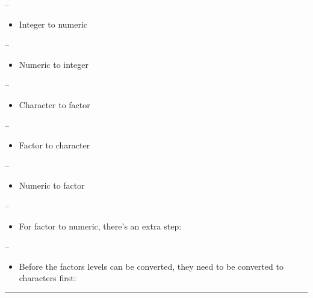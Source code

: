 \documentclass[]{article}
\newenvironment{Shaded}{\begin{snugshade}}{\end{snugshade}}
\newcommand{\KeywordTok}[1]{\textcolor[rgb]{0.13,0.29,0.53}{\textbf{#1}}}
\newcommand{\NormalTok}[1]{#1}
\newcommand{\OperatorTok}[1]{\textcolor[rgb]{0.81,0.36,0.00}{\textbf{#1}}}
\newcommand{\StringTok}[1]{\textcolor[rgb]{0.31,0.60,0.02}{#1}}
\providecommand{\tightlist}{%
  \setlength{\itemsep}{0pt}\setlength{\parskip}{0pt}}
\begin{document}
--

\begin{itemize}
\tightlist
\item
  Integer to numeric
\end{itemize}

--

\begin{itemize}
\tightlist
\item
  Numeric to integer
\end{itemize}

--

\begin{itemize}
\tightlist
\item
  Character to factor
\end{itemize}

--

\begin{itemize}
\tightlist
\item
  Factor to character
\end{itemize}

--

\begin{itemize}
\tightlist
\item
  Numeric to factor
\end{itemize}

--

\begin{itemize}
\tightlist
\item
  For factor to numeric, there's an extra step:
\end{itemize}

--

\begin{itemize}
\tightlist
\item
  Before the factors levels can be converted, they need to be converted
  to characters first:
\end{itemize}

\begin{Shaded}
\end{Shaded}

\begin{center}\rule{0.5\linewidth}{\linethickness}\end{center}
\end{document}
